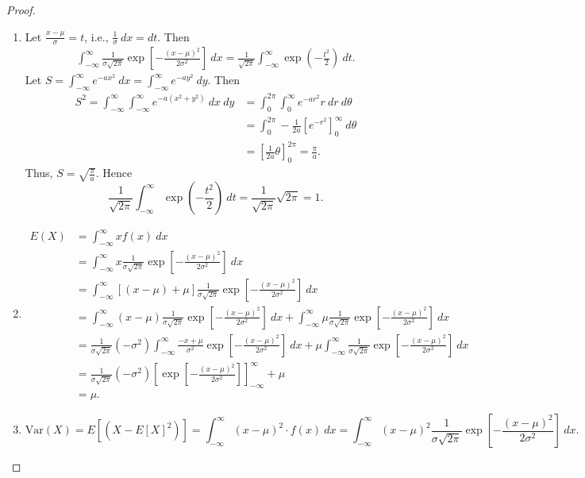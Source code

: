 \documentclass[12pt,openany]{book}
\theoremstyle{definition}
\newcommand{\dispsty}{\displaystyle}
\newcommand{\ie}{\textnormal{i.e.}}
\newcommand{\Var}{\text{Var}}
\begin{document}
	\begin{proof}
		\ \begin{enumerate}
			\item Let $\dispsty\frac{x-\mu}{\sigma}=t$, \ie, $\dispsty\frac{1}{\sigma}\ dx=dt$. Then \begin{align*}
				\int_{-\infty}^\infty\frac{1}{\sigma\sqrt{2\pi}}\exp\left[-\frac{(x-\mu)^2}{2\sigma^2}\right]\ dx=\frac{1}{\sqrt{2\pi}}\int_{-\infty}^\infty \exp\left(-\frac{t^2}{2}\right)\ dt.
			\end{align*} Let $\dispsty S=\int_{-\infty}^\infty e^{-ax^2}\ dx=\int_{-\infty}^\infty e^{-ay^2}\ dy$. Then \begin{align*}
				S^2=\int_{-\infty}^{\infty}\int_{-\infty}^{\infty}e^{-a(x^2+y^2)}\ dx\ dy&=\int_0^{2\pi}\int_{0}^{\infty}e^{-ar^2} r\ dr\ d\theta\\
				&=\int_0^{2\pi}-\frac{1}{2a}\left[e^{-r^2}\right]_0^\infty\ d\theta\\
				&=\left[\frac{1}{2a}\theta\right]_0^{2\pi}=\frac{\pi}{a}.
			\end{align*} Thus, $S=\dispsty\sqrt{\frac{\pi}{a}}$. Hence \[
			\frac{1}{\sqrt{2\pi}}\int_{-\infty}^\infty \exp\left(-\frac{t^2}{2}\right)\ dt=\frac{1}{\sqrt{2\pi}}\sqrt{2\pi}=1.
			\]
			\item \begin{align*}
				E(X)&=\int_{-\infty}^\infty xf(x)\ dx\\&=\int_{-\infty}^\infty x\frac{1}{\sigma\sqrt{2\pi}}\exp\left[-\frac{(x-\mu)^2}{2\sigma^2}\right]\ dx\\
				&=\int_{-\infty}^\infty \left[(x-\mu)+\mu\right]\frac{1}{\sigma\sqrt{2\pi}}\exp\left[-\frac{(x-\mu)^2}{2\sigma^2}\right]\ dx\\
				&=\int_{-\infty}^\infty (x-\mu)\frac{1}{\sigma\sqrt{2\pi}}\exp\left[-\frac{(x-\mu)^2}{2\sigma^2}\right]\ dx+\int_{-\infty}^\infty \mu\frac{1}{\sigma\sqrt{2\pi}}\exp\left[-\frac{(x-\mu)^2}{2\sigma^2}\right]\ dx\\
				&=\frac{1}{\sigma\sqrt{2\pi}}(-\sigma^2)\int_{-\infty}^\infty\frac{-x+\mu}{\sigma^2}\exp\left[-\frac{(x-\mu)^2}{2\sigma^2}\right]\ dx +\mu\int_{-\infty}^\infty\frac{1}{\sigma\sqrt{2\pi}}\exp\left[-\frac{(x-\mu)^2}{2\sigma^2}\right]\ dx\\
				&=\frac{1}{\sigma\sqrt{2\pi}}(-\sigma^2)\left[\exp\left[-\frac{(x-\mu)^2}{2\sigma^2}\right]\right]_{-\infty}^\infty+\mu\\
				&=\mu.
			\end{align*}
			\item \[
			\Var(X)=E[(X-E[X]^2)]=\int_{-\infty}^\infty(x-\mu)^2\cdot f(x)\ dx=\int_{-\infty}^\infty(x-\mu)^2\frac{1}{\sigma\sqrt{2\pi}}\exp\left[-\frac{(x-\mu)^2}{2\sigma^2}\right]\ dx.
\]
\end{enumerate}
\end{proof}
\end{document}
